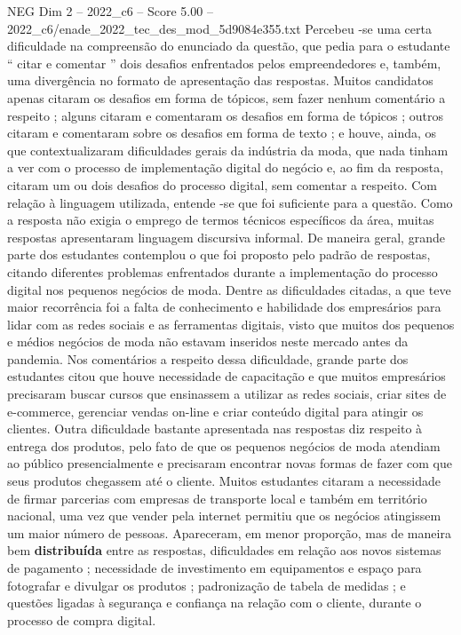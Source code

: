 \begin{textsample}{NEG Dim 2 – 2022\_c6 – Score 5.00 – 2022\_c6/enade\_2022\_tec\_des\_mod\_5d9084e355.txt}
Percebeu -se uma certa dificuldade na compreensão do enunciado da questão, que pedia para o estudante “ citar e comentar ” dois desafios enfrentados pelos empreendedores e, também, uma divergência no formato de apresentação das respostas.
Muitos candidatos apenas citaram os desafios em forma de tópicos, sem fazer nenhum comentário a respeito ; alguns citaram e comentaram os desafios em forma de tópicos ; outros citaram e comentaram sobre os desafios em forma de texto ; e houve, ainda, os que contextualizaram dificuldades gerais da indústria da moda, que nada tinham a ver com o processo de implementação digital do negócio e, ao fim da resposta, citaram um ou dois desafios do processo digital, sem comentar a respeito.
Com relação à linguagem utilizada, entende -se que foi suficiente para a questão.
Como a resposta não exigia o emprego de termos técnicos específicos da área, muitas respostas apresentaram linguagem discursiva informal.
De maneira geral, grande parte dos estudantes contemplou o que foi proposto pelo padrão de respostas, citando diferentes problemas enfrentados durante a implementação do processo digital nos pequenos negócios de moda.
Dentre as dificuldades citadas, a que teve maior recorrência foi a falta de conhecimento e habilidade dos empresários para lidar com as redes sociais e as ferramentas digitais, visto que muitos dos pequenos e médios negócios de moda não estavam inseridos neste mercado antes da pandemia.
Nos comentários a respeito dessa dificuldade, grande parte dos estudantes citou que houve necessidade de capacitação e que muitos empresários precisaram buscar cursos que ensinassem a utilizar as redes sociais, criar sites de e-commerce, gerenciar vendas on-line e criar conteúdo digital para atingir os clientes.
Outra dificuldade bastante apresentada nas respostas diz respeito à entrega dos produtos, pelo fato de que os pequenos negócios de moda atendiam ao público presencialmente e precisaram encontrar novas formas de fazer com que seus produtos chegassem até o cliente.
Muitos estudantes citaram a necessidade de firmar parcerias com empresas de transporte local e também em território nacional, uma vez que vender pela internet permitiu que os negócios atingissem um maior número de pessoas.
Apareceram, em menor proporção, mas de maneira bem \textbf{distribuída} entre as respostas, dificuldades em relação aos novos sistemas de pagamento ; necessidade de investimento em equipamentos e espaço para fotografar e divulgar os produtos ; padronização de tabela de medidas ; e questões ligadas à segurança e confiança na relação com o cliente, durante o processo de compra digital.

\end{textsample}
